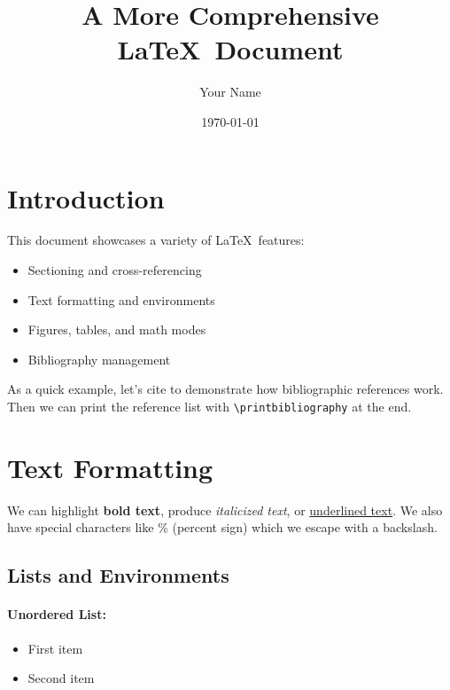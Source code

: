 \documentclass[12pt]{article}
\title{A More Comprehensive \LaTeX~Document}
\author{Your Name}
\date{\today}
\begin{document}
\maketitle

\section{Introduction}
This document showcases a variety of \LaTeX\ features:
\begin{itemize}
    \item Sectioning and cross-referencing
    \item Text formatting and environments
    \item Figures, tables, and math modes
    \item Bibliography management 
\end{itemize}

As a quick example, let's cite \cite{einstein1905} to demonstrate how bibliographic references work.
Then we can print the reference list with \texttt{\textbackslash printbibliography} at the end.

\section{Text Formatting}
We can highlight \textbf{bold text}, produce \textit{italicized text}, or \underline{underlined text}.
\noindent We also have special characters like \% (percent sign) which we escape with a backslash.

\subsection{Lists and Environments}
\paragraph{Unordered List:}
\begin{itemize}
    \item First item
    \item Second item
\end{itemize}
\end{document}

